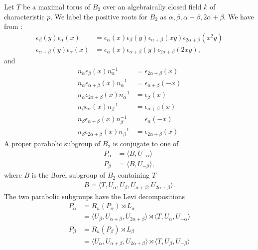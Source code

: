 Let $T$ be a maximal torus of $B_2$ over an algebraically closed field $k$ of characteristic $p$. We label the positive roots for $B_2$ as $\alpha, \beta, \alpha + \beta, 2\alpha + \beta$. We have from \cite[\S 33.4]{humphreys1975linear}:
\begin{align*}
\epsilon_\beta (y) \epsilon_\alpha (x) &= \epsilon_\alpha (x) \epsilon_\beta (y) \epsilon_{\alpha + \beta} (xy) \epsilon_{2\alpha+\beta} (x^2y) \\
\epsilon_{\alpha + \beta} (y) \epsilon_\alpha (x) &= \epsilon_\alpha (x) \epsilon_{\alpha + \beta} (y) \epsilon_{2\alpha + \beta} (2xy),
\end{align*}
and 
\begin{align*}
n_\alpha \epsilon_\beta(x) n_\alpha^{-1} &= \epsilon_{2\alpha+\beta}(x)\\
n_\alpha \epsilon_{\alpha+\beta}(x) n_\alpha^{-1} &= \epsilon_{\alpha+\beta}(-x)\\
n_\alpha \epsilon_{2\alpha+\beta}(x) n_\alpha^{-1} &= \epsilon_{\beta}(x)\\
n_\beta \epsilon_\alpha(x) n_\beta^{-1} &= \epsilon_{\alpha+\beta}(x)\\
n_\beta \epsilon_{\alpha+\beta}(x) n_\beta^{-1} &= \epsilon_{\alpha}(-x)\\
n_\beta \epsilon_{2\alpha+\beta}(x) n_\beta^{-1} &= \epsilon_{2\alpha+\beta}(x)
\end{align*}
A proper parabolic subgroup of $B_2$ is conjugate to one of
\begin{align*}
P_\alpha &= \langle B, U_{-\alpha} \rangle\\
P_\beta &= \langle B, U_{-\beta} \rangle,
\end{align*}
where $B$ is the Borel subgroup of $B_2$ containing $T$
\begin{align*}
B=\langle T, U_\alpha, U_\beta, U_{\alpha + \beta}, U_{2\alpha+\beta}\rangle.
\end{align*}
The two parabolic subgroups have the Levi decompositions
\begin{align*}
P_\alpha &= R_u(P_\alpha) \rtimes L_\alpha \\
&= \langle U_\beta, U_{\alpha + \beta}, U_{2\alpha + \beta} \rangle \rtimes \langle T, U_\alpha, U_{-\alpha} \rangle \\ 
P_\beta &= R_u(P_\beta) \rtimes L_\beta \\
&= \langle U_\alpha, U_{\alpha+\beta}, U_{2\alpha + \beta} \rangle \rtimes \langle T, U_\beta, U_{-\beta} \rangle \\
\end{align*}

